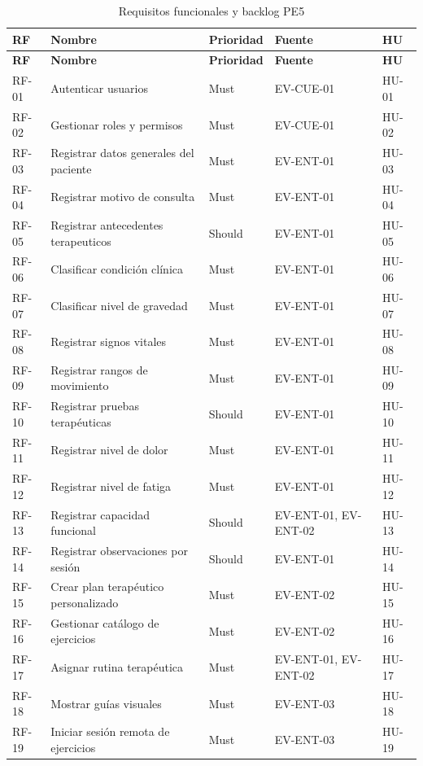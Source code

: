 \documentclass[12pt,a4paper]{article}
\begin{document}
\small
\begin{longtable}{p{}p{}p{}p{}p{}}
\caption{Requisitos funcionales y backlog PE5}\\\toprule
\textbf{RF}&\textbf{Nombre}&\textbf{Prioridad}&\textbf{Fuente}&\textbf{HU}\\\midrule\endfirsthead
\toprule\textbf{RF}&\textbf{Nombre}&\textbf{Prioridad}&\textbf{Fuente}&\textbf{HU}\\\midrule\endhead

RF-01 & Autenticar usuarios & Must & EV-CUE-01 & HU-01 \\
RF-02 & Gestionar roles y permisos & Must & EV-CUE-01 & HU-02 \\
RF-03 & Registrar datos generales del paciente & Must & EV-ENT-01 & HU-03 \\
RF-04 & Registrar motivo de consulta & Must & EV-ENT-01 & HU-04 \\
RF-05 & Registrar antecedentes terapeuticos & Should & EV-ENT-01 & HU-05 \\
RF-06 & Clasificar condición clínica & Must & EV-ENT-01 & HU-06 \\
RF-07 & Clasificar nivel de gravedad & Must & EV-ENT-01 & HU-07 \\
RF-08 & Registrar signos vitales & Must & EV-ENT-01 & HU-08 \\
RF-09 & Registrar rangos de movimiento & Must & EV-ENT-01 & HU-09 \\
RF-10 & Registrar pruebas terapéuticas & Should & EV-ENT-01 & HU-10 \\
RF-11 & Registrar nivel de dolor & Must & EV-ENT-01 & HU-11 \\
RF-12 & Registrar nivel de fatiga & Must & EV-ENT-01 & HU-12 \\
RF-13 & Registrar capacidad funcional & Should & EV-ENT-01, EV-ENT-02 & HU-13 \\
RF-14 & Registrar observaciones por sesión & Should & EV-ENT-01 & HU-14 \\
RF-15 & Crear plan terapéutico personalizado & Must & EV-ENT-02 & HU-15 \\
RF-16 & Gestionar catálogo de ejercicios & Must & EV-ENT-02 & HU-16 \\
RF-17 & Asignar rutina terapéutica & Must & EV-ENT-01, EV-ENT-02 & HU-17 \\
RF-18 & Mostrar guías visuales & Must & EV-ENT-03 & HU-18 \\
RF-19 & Iniciar sesión remota de ejercicios & Must & EV-ENT-03 & HU-19 \\

\end{longtable}
\end{document}
